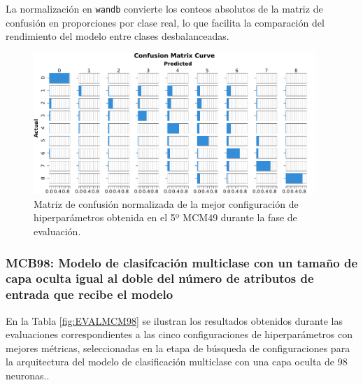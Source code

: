 La normalización en \texttt{wandb} convierte los conteos absolutos de la matriz de confusión en proporciones por clase real, lo que facilita la comparación del rendimiento del modelo entre clases desbalanceadas.

\begin{figure}[H]
    \centering
    \includegraphics[width=0.95\textwidth]{./img/evaluacion/matrices_confusion/MCNorm_EVAL_MCM49.pdf}
    \caption{Matriz de confusión normalizada de la mejor configuración de hiperparámetros obtenida en el 5º MCM49 durante la fase de evaluación.}
    \label{fig:MCNorm_EVAL_MCM49}
\end{figure}




\subsubsection{MCB98: Modelo de clasifcación multiclase con un tamaño de capa oculta igual al doble del número de atributos de entrada que recibe el modelo}
En la Tabla \ref{fig:EVALMCM98} se ilustran los resultados obtenidos durante las evaluaciones correspondientes a las cinco configuraciones de hiperparámetros con mejores métricas, seleccionadas en la etapa de búsqueda de configuraciones para la arquitectura del modelo de clasificación multiclase con una capa oculta de 98 neuronas..

